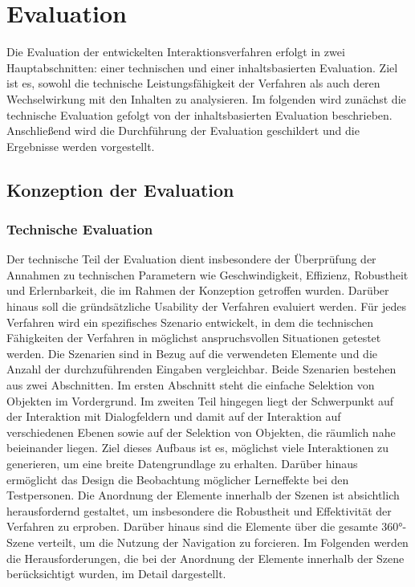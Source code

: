 \chapter{Evaluation}
\label{chap:Evaluation}

Die Evaluation der entwickelten Interaktionsverfahren erfolgt in zwei Hauptabschnitten: einer technischen und einer inhaltsbasierten Evaluation. Ziel ist es, sowohl die technische Leistungsfähigkeit der Verfahren als auch deren Wechselwirkung mit den Inhalten zu analysieren. Im folgenden wird zunächst die technische Evaluation gefolgt von der inhaltsbasierten Evaluation beschrieben. Anschließend wird die Durchführung der Evaluation geschildert und die Ergebnisse werden vorgestellt. 

\section{Konzeption der Evaluation}

\subsection{Technische Evaluation}

Der technische Teil der Evaluation dient insbesondere der Überprüfung der Annahmen zu technischen Parametern wie Geschwindigkeit, Effizienz, Robustheit und Erlernbarkeit, die im Rahmen der Konzeption getroffen wurden. Darüber hinaus soll die gründsätzliche Usability der Verfahren evaluiert werden. Für jedes Verfahren wird ein spezifisches Szenario entwickelt, in dem die technischen Fähigkeiten der Verfahren in möglichst anspruchsvollen Situationen getestet werden. Die Szenarien sind in Bezug auf die verwendeten Elemente und die Anzahl der durchzuführenden Eingaben vergleichbar. Beide Szenarien bestehen aus zwei Abschnitten. Im ersten Abschnitt steht die einfache Selektion von Objekten im Vordergrund. Im zweiten Teil hingegen liegt der Schwerpunkt auf der Interaktion mit Dialogfeldern und damit auf der Interaktion auf verschiedenen Ebenen sowie auf der Selektion von Objekten, die räumlich nahe beieinander liegen. Ziel dieses Aufbaus ist es, möglichst viele Interaktionen zu generieren, um eine breite Datengrundlage zu erhalten. Darüber hinaus ermöglicht das Design die Beobachtung möglicher Lerneffekte bei den Testpersonen. Die Anordnung der Elemente innerhalb der Szenen ist absichtlich herausfordernd gestaltet, um insbesondere die Robustheit und Effektivität der Verfahren zu erproben. Darüber hinaus sind die Elemente über die gesamte 360°-Szene verteilt, um die Nutzung der Navigation zu forcieren. Im Folgenden werden die Herausforderungen, die bei der Anordnung der Elemente innerhalb der Szene berücksichtigt wurden, im Detail dargestellt. 

